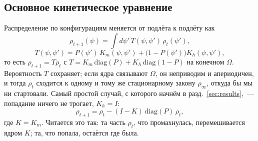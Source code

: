 \documentclass[pre,twocolumn,superscriptaddress,showpacs=false,amsmath,amssymb,nofootinbib]{revtex4-2}
\begin{document}
\subsection{Основное кинетическое уравнение}
Распределение по конфигурациям меняется от подлёта к подлёту как
\begin{equation}
\rho_{t+1}(\psi)=\int d\psi'\,T(\psi,\psi')\,\rho_t(\psi'),
\label{eq:master}
\end{equation}
\begin{equation}
T(\psi,\psi')=P(\psi')\,K_m(\psi,\psi')+\bigl(1-P(\psi')\bigr)K_h(\psi,\psi'),
\label{eq:T}
\end{equation}
то есть $\rho_{t+1}=T\rho_t$ с $T=K_m\,\mathrm{diag}(P)+K_h\,\mathrm{diag}(1-P)$ на конечном $\Omega$. Вероятность $T$ сохраняет; если ядра связывают $\Omega$, он неприводим и апериодичен, и тогда $\rho_t$ сходится к одному и тому же стационарному закону $\rho_\infty$, откуда бы мы ни стартовали. Самый простой случай, с которого начнём в разд.~\ref{sec:results},~--- попадание ничего не трогает, $K_h=I$:
\begin{equation}
\rho_{t+1}=\rho_t-(I-K)\,\mathrm{diag}(P)\,\rho_t ,
\label{eq:chain}
\end{equation}
где $K=K_m$. Читается это так: та часть $\rho_t$, что промахнулась, перемешивается ядром $K$; та, что попала, остаётся где была.
\end{document}
